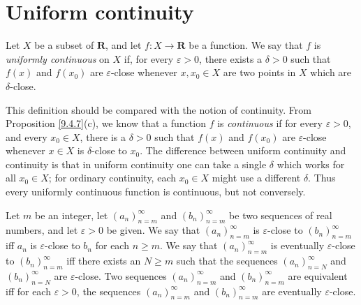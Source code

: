 \section{Uniform continuity}\label{sec 9.9}

\setcounter{theorem}{1}
\begin{definition}\label{9.9.2}
    Let \(X\) be a subset of \(\mathbf{R}\), and let \(f : X \to \mathbf{R}\) be a function.
    We say that \(f\) is \emph{uniformly continuous} on \(X\) if, for every \(\varepsilon > 0\), there exists a \(\delta > 0\) such that \(f(x)\) and \(f(x_0)\) are \(\varepsilon\)-close whenever \(x, x_0 \in X\) are two points in \(X\) which are \(\delta\)-close.
\end{definition}

\begin{remark}\label{9.9.3}
    This definition should be compared with the notion of continuity.
    From Proposition \ref{9.4.7}(c), we know that a function \(f\) is \emph{continuous} if for every \(\varepsilon > 0\), and every \(x_0 \in X\), there is a \(\delta > 0\) such that \(f(x)\) and \(f(x_0)\) are \(\varepsilon\)-close whenever \(x \in X\) is \(\delta\)-close to \(x_0\).
    The difference between uniform continuity and continuity is that in uniform continuity one can take a single \(\delta\) which works for all \(x_0 \in X\);
    for ordinary continuity, each \(x_0 \in X\) might use a different \(\delta\).
    Thus every uniformly continuous function is continuous, but not conversely.
\end{remark}

\setcounter{theorem}{4}
\begin{definition}\label{9.9.5}
    Let \(m\) be an integer, let \((a_n)_{n = m}^\infty\) and \((b_n)_{n = m}^\infty\) be two sequences of real numbers, and let \(\varepsilon > 0\) be given.
    We say that \((a_n)_{n = m}^\infty\) is \(\varepsilon\)-close to \((b_n)_{n = m}^\infty\) iff \(a_n\) is \(\varepsilon\)-close to \(b_n\) for each \(n \geq m\).
    We say that \((a_n)_{n = m}^\infty\) is eventually \(\varepsilon\)-close to \((b_n)_{n = m}^\infty\) iff there exists an \(N \geq m\) such that the sequences \((a_n)_{n = N}^\infty\) and \((b_n)_{n = N}^\infty\) are \(\varepsilon\)-close.
    Two sequences \((a_n)_{n = m}^\infty\) and \((b_n)_{n = m}^\infty\) are equivalent iff for each \(\varepsilon > 0\), the sequences \((a_n)_{n = m}^\infty\) and \((b_n)_{n = m}^\infty\) are eventually \(\varepsilon\)-close.
\end{definition}


